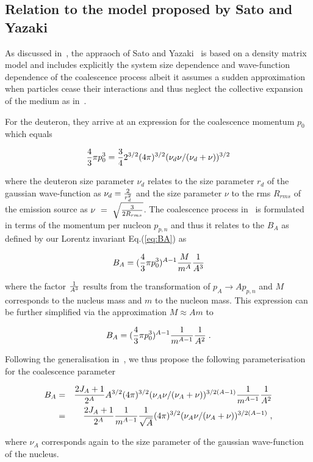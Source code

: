 \documentclass[a4paper,11pt]{scrartcl} %
\begin{document}
\begin{appendix}
\section{Relation to the model proposed by Sato and Yazaki}

As discussed in~\cite{Nagle:1996vp}, the appraoch of Sato and Yazaki~\cite{Sato:1981ez} is based on a density matrix model and includes explicitly the system size dependence and wave-function dependence of the coalescence process albeit it assumes a sudden approximation when particles cease their interactions and thus neglect the collective expansion of the medium as in~\cite{Scheibl:1998tk}.

For the deuteron, they arrive at an expression for the coalescence momentum $p_{0}$ which equals

\begin{equation}
	{4 \over 3} \pi p_{0}^{3} = {3 \over 4} 2^{3/2} (4\pi)^{3/2} (\nu_{d}\nu/(\nu_d + \nu))^{3/2}
\end{equation}

\noindent where the deuteron size parameter $\nu_d$ relates to the size parameter $r_{d}$ of the gaussian wave-function as $\nu_d = {2 \over r_{d}^2}$ and the size parameter $\nu$ to the rms $R_{rms}$ of the emission source as $\nu~=~\sqrt{3 \over 2 R_{rms}}$. The coalescence process in~\cite{Sato:1981ez} is formulated in terms of the momentum per nucleon $p_{p,n}$ and thus it relates to the $B_{A}$ as defined by our Lorentz invariant Eq.(\ref{eq:BA}) as

\begin{equation}
B_{A} = ({4 \over 3} \pi p_{0}^{3})^{A-1} {M \over m^{A}} {1 \over A^{3}}
\end{equation}

\noindent where the factor ${1 \over A^{3}}$ results from the transformation of $p_{A} \rightarrow A p_{p,n}$ and $M$ corresponds to the nucleus mass and $m$ to the nucleon mass. This expression can be further simplified via the approximation $M \approx A m$ to

\begin{equation}
B_{A} = ({4 \over 3} \pi p_{0}^{3})^{A-1} {1 \over m^{A-1}} {1 \over A^{2}} \; .
\end{equation}

\noindent Following the generalisation in~\cite{Nagle:1996vp}, we thus propose the following parameterisation for the coalescence parameter


\begin{eqnarray}
B_{A} &=& {2J_{A} + 1 \over 2^{A}} A^{3/2} (4\pi)^{3/2} (\nu_{A}\nu/(\nu_{A}+ \nu))^{3/2(A-1)} {1 \over m^{A-1}} {1 \over A^{2}}  \\
           &=&  {2J_{A} + 1 \over 2^{A}} {1 \over m^{A-1}} {1 \over \sqrt{A}} (4\pi)^{3/2} (\nu_{A}\nu/(\nu_{A}+ \nu))^{3/2(A-1)} \;,
\end{eqnarray}

\noindent where $\nu_{A}$ corresponds again to the size parameter of the gaussian wave-function of the nucleus.

\end{appendix}
\end{document}
